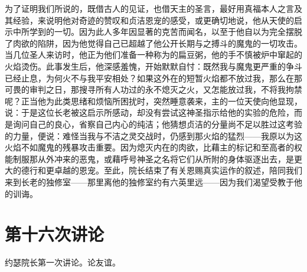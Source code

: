 为了证明我们所说的，既借古人的见证，也借天主的圣言，最好用真福本人之言及其经验，来说明他对奇迹的赞叹和贞洁恩宠的感受，或更确切地说，他从天使的启示中所学到的一切。因为此人多年因显著的克苦而闻名，以至于他自以为完全摆脱了肉欲的陷阱，因为他觉得自己已超越了他公开长期与之搏斗的魔鬼的一切攻击。当几位圣人来访时，他正为他们准备一种称为的扁豆粥，他的手不慎被炉中窜起的火焰烫伤。此事发生后，他深感羞愧，开始默默自忖：既然我与魔鬼更严重的争斗已经止息，为何火不与我平安相处？如果这外在的短暂火焰都不放过我，那么在那可畏的审判之日，那搜寻所有人功过的永不熄灭之火，又怎能放过我，不将我拘禁呢？正当他为此类思绪和烦恼所困扰时，突然睡意袭来，主的一位天使向他显现，说：于是这位长老被这启示所感动，却没有尝试这神圣指示给他的实验的危险，而是询问自己的良心，省察自己内心的纯洁；他猜想贞洁的分量尚不足以胜过这考验的力量，便说：难怪当我与不洁之灵交战时，仍感到那火焰的猛烈——我原以为这火焰不如魔鬼的残暴攻击重要。因为熄灭内在的肉欲，比藉主的标记和至高者的权能制服那从外冲来的恶鬼，或藉呼号神圣之名将它们从所附的身体驱逐出去，是更大的德行和更卓越的恩宠。至此，院长结束了有关恩赐真实运作的叙述，陪同我们来到长老的独修室——那里离他的独修室约有六英里远——因为我们渴望受教于他的训诲。\par



\section{第十六次讲论}

\par

约瑟院长第一次讲论。论友谊。\par


